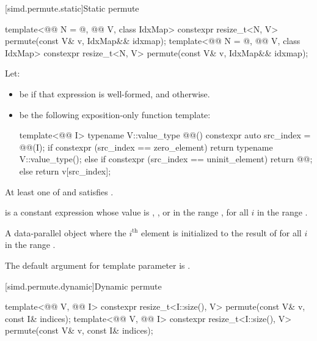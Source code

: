 [simd.permute.static]{Static permute}

\begin{itemdecl}
template<@@ N = @\seebelow@, @@ V, class IdxMap>
  constexpr resize_t<N, V> permute(const V& v, IdxMap&& idxmap);
template<@@ N = @\seebelow@, @@ V, class IdxMap>
  constexpr resize_t<N, V> permute(const V& v, IdxMap&& idxmap);
\end{itemdecl}

\begin{itemdescr}
\pnum
Let:
\begin{itemize}
\item
{} be 
if that expression is well-formed, and  otherwise.
\item
{} be the following exposition-only function template:
\begin{codeblock}
template<@@ I>
typename V::value_type @@() {
  constexpr auto src_index = @@(I);
  if constexpr (src_index == zero_element) {
    return typename V::value_type();
  } else if constexpr (src_index == uninit_element) {
    return @@;
  } else {
    return v[src_index];
  }
}
\end{codeblock}
\end{itemize}

\pnum
\constraints
At least one of
and
satisfies .

\pnum
\mandates
{} is a constant expression whose value is
, , or in the range
, for all $i$ in the range .

\pnum
\returns
A data-parallel object where the
$i^\text{th}$ element is initialized to the result of
 for all $i$ in the range .

\pnum
\remarks
The default argument for template parameter  is .
\end{itemdescr}

[simd.permute.dynamic]{Dynamic permute}

\begin{itemdecl}
template<@@ V, @@ I>
  constexpr resize_t<I::size(), V> permute(const V& v, const I& indices);
template<@@ V, @@ I>
  constexpr resize_t<I::size(), V> permute(const V& v, const I& indices);
\end{itemdecl}


